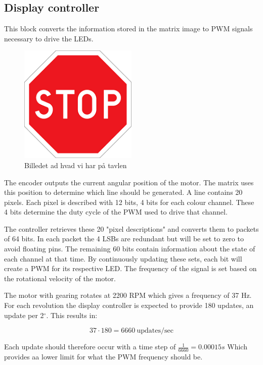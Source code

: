 \subsection{Display controller}
This block converts the information stored in the matrix image to PWM signals necessary to drive the LEDs.

\begin{figure}[H]
	\center
	\includegraphics[width = 0.5\textwidth]{images/stop}
	\caption{Billedet ad hvad vi har på tavlen}
	\label{fig:Image_controller_setup}
\end{figure}

The encoder outputs the current angular position of the motor.
The matrix uses this position to determine which line should be generated.
A line contains 20 pixels.
Each pixel is described with 12 bits, 4 bits for each colour channel.
These 4 bits determine the duty cycle of the PWM used to drive that channel.

The controller retrieves these 20 "pixel descriptions" and converts them to packets of 64 bits.
In each packet the 4 LSBs are redundant but will be set to zero to avoid floating pins.
The remaining 60 bits contain information about the state of each channel at that time.
By continuously updating these sets, each bit will create a PWM for its respective LED.
The frequency of the signal is set based on the rotational velocity of the motor.

The motor with gearing rotates at 2200 RPM which gives a frequency of 37 Hz.	
For each revolution the display controller is expected to provide 180 updates, an update per 2$^\circ$.
This results in:

$$37 \cdot 180 = 6660 ~\text{updates/sec}$$

Each update should therefore occur with a time step of $\frac{1}{6660} = 0.00015s$ Which provides aa lower limit for what the PWM frequency should be.  \\

